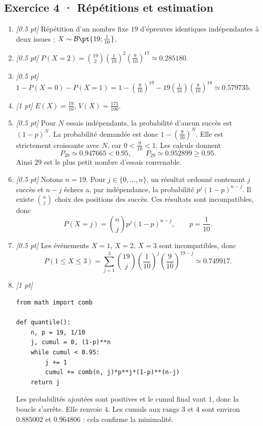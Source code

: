 \subsection*{Exercice 4 · Répétitions et estimation}\begin{enumerate}

\item \textit{[\num{0,5} pt]} Répétition d'un nombre fixe $19$ d'épreuves identiques indépendantes à deux issues ; $X\sim\mathcal B\pt{19;\frac{1}{10}}$.

\item \textit{[\num{0,5} pt]} $P(X=2)=\binom{19}2(\frac{1}{10})^2(\frac{9}{10})^{17}\simeq\num{0,285180}$.

\item \textit{[\num{0,5} pt]} $1-P(X=0)-P(X=1)=1-(\frac{9}{10})^{19}-19(\frac{1}{10})(\frac{9}{10})^{18}\simeq\num{0,579735}$.

\item \textit{[1 pt]} $E(X)=\frac{19}{10}$, $V(X)=\frac{171}{100}$.

\item \textit{[\num{0,5} pt]} Pour $N$ essais indépendants, la probabilité d'aucun succès est $(1-p)^N$. La probabilité demandée est donc $1-(\frac{9}{10})^N$. Elle est strictement croissante avec $N$, car $0<\frac{9}{10}<1$. Les calculs donnent
\[P_{28}\simeq\num{0,947665}<\num{0,95},\qquad P_{29}\simeq\num{0,952899}\ge\num{0,95}.\]
Ainsi $29$ est le plus petit nombre d'essais convenable.

\item \textit{[\num{0,5} pt]} Notons $n=19$. Pour $j\in\{0,\ldots,n\}$, un résultat ordonné contenant $j$ succès et $n-j$ échecs a, par indépendance, la probabilité $p^j(1-p)^{n-j}$. Il existe $\binom nj$ choix des positions des succès. Ces résultats sont incompatibles, donc
\[P(X=j)=\binom nj p^j(1-p)^{n-j},\qquad p=\frac{1}{10}.\]

\item \textit{[\num{0,5} pt]} Les événements $X=1$, $X=2$, $X=3$ sont incompatibles, donc
\[P(1\le X\le3)=\sum_{j=1}^3\binom{19}j(\frac{1}{10})^j(\frac{9}{10})^{19-j}\simeq\num{0,749917}.\]


\item \textit{[1 pt]} 
\begin{lstlisting}
from math import comb

def quantile():
    n, p = 19, 1/10
    j, cumul = 0, (1-p)**n
    while cumul < 0.95:
        j += 1
        cumul += comb(n, j)*p**j*(1-p)**(n-j)
    return j
\end{lstlisting}
Les probabilités ajoutées sont positives et le cumul final vaut $1$, donc la boucle s'arrête. Elle renvoie $4$. Les cumuls aux rangs $3$ et $4$ sont environ $\num{0,885002}$ et $\num{0,964806}$ : cela confirme la minimalité.

\end{enumerate}

\fi

\fi

